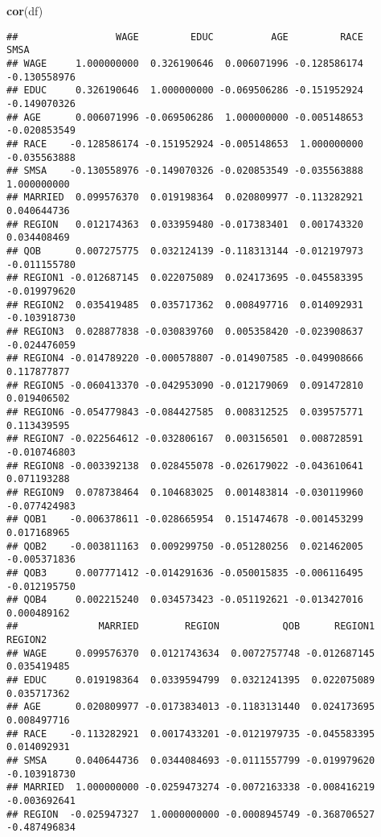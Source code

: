 \documentclass[
]{article}
\newenvironment{Shaded}{\begin{snugshade}}{\end{snugshade}}
\newcommand{\FunctionTok}[1]{\textcolor[rgb]{0.13,0.29,0.53}{\textbf{#1}}}
\newcommand{\NormalTok}[1]{#1}
\begin{document}
\begin{Shaded}
\begin{Highlighting}[]
\FunctionTok{cor}\NormalTok{(df)}
\end{Highlighting}
\end{Shaded}

\begin{verbatim}
##                 WAGE         EDUC          AGE         RACE         SMSA
## WAGE     1.000000000  0.326190646  0.006071996 -0.128586174 -0.130558976
## EDUC     0.326190646  1.000000000 -0.069506286 -0.151952924 -0.149070326
## AGE      0.006071996 -0.069506286  1.000000000 -0.005148653 -0.020853549
## RACE    -0.128586174 -0.151952924 -0.005148653  1.000000000 -0.035563888
## SMSA    -0.130558976 -0.149070326 -0.020853549 -0.035563888  1.000000000
## MARRIED  0.099576370  0.019198364  0.020809977 -0.113282921  0.040644736
## REGION   0.012174363  0.033959480 -0.017383401  0.001743320  0.034408469
## QOB      0.007275775  0.032124139 -0.118313144 -0.012197973 -0.011155780
## REGION1 -0.012687145  0.022075089  0.024173695 -0.045583395 -0.019979620
## REGION2  0.035419485  0.035717362  0.008497716  0.014092931 -0.103918730
## REGION3  0.028877838 -0.030839760  0.005358420 -0.023908637 -0.024476059
## REGION4 -0.014789220 -0.000578807 -0.014907585 -0.049908666  0.117877877
## REGION5 -0.060413370 -0.042953090 -0.012179069  0.091472810  0.019406502
## REGION6 -0.054779843 -0.084427585  0.008312525  0.039575771  0.113439595
## REGION7 -0.022564612 -0.032806167  0.003156501  0.008728591 -0.010746803
## REGION8 -0.003392138  0.028455078 -0.026179022 -0.043610641  0.071193288
## REGION9  0.078738464  0.104683025  0.001483814 -0.030119960 -0.077424983
## QOB1    -0.006378611 -0.028665954  0.151474678 -0.001453299  0.017168965
## QOB2    -0.003811163  0.009299750 -0.051280256  0.021462005 -0.005371836
## QOB3     0.007771412 -0.014291636 -0.050015835 -0.006116495 -0.012195750
## QOB4     0.002215240  0.034573423 -0.051192621 -0.013427016  0.000489162
##              MARRIED        REGION           QOB      REGION1      REGION2
## WAGE     0.099576370  0.0121743634  0.0072757748 -0.012687145  0.035419485
## EDUC     0.019198364  0.0339594799  0.0321241395  0.022075089  0.035717362
## AGE      0.020809977 -0.0173834013 -0.1183131440  0.024173695  0.008497716
## RACE    -0.113282921  0.0017433201 -0.0121979735 -0.045583395  0.014092931
## SMSA     0.040644736  0.0344084693 -0.0111557799 -0.019979620 -0.103918730
## MARRIED  1.000000000 -0.0259473274 -0.0072163338 -0.008416219 -0.003692641
## REGION  -0.025947327  1.0000000000 -0.0008945749 -0.368706527 -0.487496834

\end{verbatim}
\end{document}
